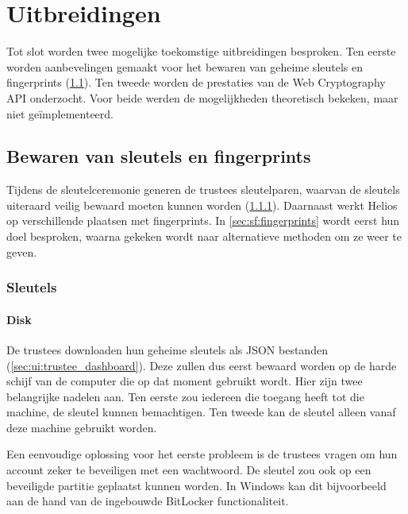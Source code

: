 %
%

\chapter{Uitbreidingen}
\label{chap:uitbreidingen}

Tot slot worden twee mogelijke toekomstige uitbreidingen besproken. Ten eerste worden aanbevelingen gemaakt voor het bewaren van geheime sleutels en fingerprints (\ref{chap:sleutels_en_fingerprints}). Ten tweede worden de prestaties van de Web Cryptography API onderzocht. Voor beide werden de mogelijkheden theoretisch bekeken, maar niet ge\"implementeerd.

\section{Bewaren van sleutels en fingerprints}
\label{chap:sleutels_en_fingerprints}

Tijdens de sleutelceremonie generen de trustees sleutelparen, waarvan de sleutels uiteraard veilig bewaard moeten kunnen worden (\ref{sec:sf:sleutels}). Daarnaast werkt Helios op verschillende plaatsen met fingerprints. In \ref{sec:sf:fingerprints} wordt eerst hun doel besproken, waarna gekeken wordt naar alternatieve methoden om ze weer te geven.

\subsection{Sleutels}
\label{sec:sf:sleutels}

\subsubsection{Disk}
\label{sec:sf:disk}

De trustees downloaden hun geheime sleutels als JSON bestanden (\ref{sec:ui:trustee_dashboard}). Deze zullen dus eerst bewaard worden op de harde schijf van de computer die op dat moment gebruikt wordt. Hier zijn twee belangrijke nadelen aan. Ten eerste zou iedereen die toegang heeft tot die machine, de sleutel kunnen bemachtigen. Ten tweede kan de sleutel alleen vanaf deze machine gebruikt worden.

\npar Een eenvoudige oplossing voor het eerste probleem is de trustees vragen om hun account zeker te beveiligen met een wachtwoord. De sleutel zou ook op een beveiligde partitie geplaatst kunnen worden. In Windows kan dit bijvoorbeeld aan de hand van de ingebouwde BitLocker functionaliteit.\cite{site:bitlocker}

